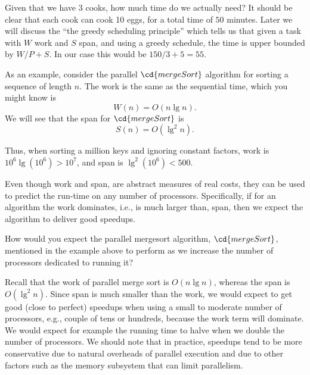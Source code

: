 \begin{flex}
\begin{example}
Given that we have $3$ cooks, how much time do we actually need?
%
It should be clear that each cook can cook 10 eggs, for a total time of $50$
minutes.   Later we will discuss the ``the greedy scheduling
principle'' which tells us that given a task with $W$ work and $S$
span, and using a greedy schedule, the time is upper bounded by $W/P+
S$.    In our case this would be $150/3 + 5 = 55$.
\end{example}
\end{flex}


\begin{example}
\label{ex:intro::intro::mergesort-cost}
As an example, consider the parallel $\cd{mergeSort}$ algorithm for
sorting a sequence of length $n$.  The work is the same as the
sequential time, which you might know is
\[
W(n) = O(n \lg{n}).
\] 
%
We will see that the span for
$\cd{mergeSort}$ is
\[
S(n) = O(\lg^2{n}).
\]

Thus, when  sorting a million keys and ignoring constant factors, 
work is $10^6\lg (10^6) > 10^7$, and 
%
span is 
$\lg^2(10^6) < 500.$
%
\end{example}

\begin{gram}
Even though work and span, are abstract measures of real costs, they
can be used to predict the run-time on any number of processors.
%
Specifically, if for an algorithm the work dominates, i.e., is much
larger than, span, then we expect the algorithm to deliver good
speedups.
\end{gram}
%

\begin{flex}
\begin{exercise}
How would you expect the parallel mergesort algorithm, $\cd{mergeSort}$,
mentioned in the example above to perform as we increase the number of
processors dedicated to running it?
\end{exercise}

\begin{solution}
Recall that the work of parallel merge sort is $O(n\lg{n})$, whereas
the span is $O(\lg^2{n})$.  
%
Since span is much smaller than the work, we would expect to get good
(close to perfect) speedups when using a small to moderate number of
processors, e.g., couple of tens or hundreds, because the work term
will dominate.
%
We would expect for example the running time to halve when we double
the number of processors.
%
We should note that in practice, speedups tend to be more conservative
due to natural overheads of parallel execution and due to other
factors such as the memory subsystem that can limit parallelism. 
\end{solution}
\end{flex}

